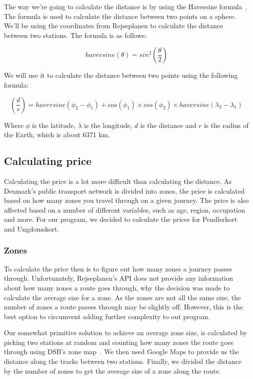 The way we're going to calculate the distance is by using the Haversine formula~\cite{haversine}.
The formula is used to calculate the distance between two points on a sphere.
We'll be using the coordinates from Rejseplanen to calculate the distance between two stations.
The formula is as follows:

\begin{equation}
    haversine(\theta) = sin^{2}(\frac{\theta}{2})
\end{equation}

We will use it to calculate the distance between two points using the following formula:

\begin{equation}
    (\frac{d}{r}) = haversine(\phi_{2} - \phi_{1}) + cos(\phi_{1}) \times cos(\phi_{2}) \times haversine(\lambda_{2} - \lambda_{1})
\end{equation}

Where \(\phi\) is the latitude, \(\lambda\) is the longitude, \(d\) is the distance and \(r\) is the radius of the
Earth, which is about 6371 km.

\subsection{Calculating price}\label{subsec:calculating-price}

Calculating the price is a lot more difficult than calculating the distance.
As Denmark's public transport network is divided into zones, the price is calculated based on how many zones you travel
through on a given journey.
The price is also affected based on a number of different variables, such as age, region, occupation and more.
For our program, we decided to calculate the prices for Pendlerkort and Ungdomskort.

\subsubsection{Zones}

To calculate the price then is to figure out how many zones a journey passes through.
Unfortunately, Rejseplanen's API does not provide any information about how many zones a route goes through, why the
decision was made to calculate the average size for a zone.
As the zones are not all the same size, the number of zones a route passes through may be slightly off.
However, this is the best option to circumvent adding further complexity to out program.

Our somewhat primitive solution to achieve an average zone size, is calculated by picking two stations at random and
counting how many zones the route goes through using DSB's zone map~\cite{price_zones}.
We then used Google Maps to provide us the distance along the tracks between two stations.
Finally, we divided the distance by the number of zones to get the average size of a zone along the route.

